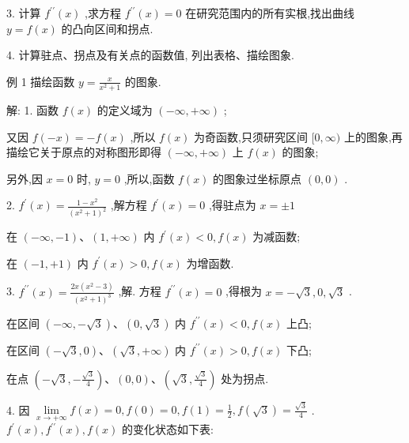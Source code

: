 \documentclass[lang=cn,newtx,12pt,scheme=chinese]{elegantbook}
\begin{document}
3. 计算 \({f}^{\prime \prime }\left( x\right)\) ,求方程 \({f}^{\prime \prime }\left( x\right) = 0\) 在研究范围内的所有实根,找出曲线 \(y = f\left( x\right)\) 的凸向区间和拐点.

4. 计算驻点、拐点及有关点的函数值, 列出表格、描绘图象.

例 1 描绘函数 \(y = \frac{x}{{x}^{2} + 1}\) 的图象.

解: 1. 函数 \(f\left( x\right)\) 的定义域为 \(\left( {-\infty , + \infty }\right)\) ;

又因 \(f\left( {-x}\right) = - f\left( x\right)\) ,所以 \(f\left( x\right)\) 为奇函数,只须研究区间 \(\lbrack 0,\infty )\) 上的图象,再描绘它关于原点的对称图形即得 \(\left( {-\infty , + \infty }\right)\) 上 \(f\left( x\right)\) 的图象;

另外,因 \(x = 0\) 时, \(y = 0\) ,所以,函数 \(f\left( x\right)\) 的图象过坐标原点 \(\left( {0,0}\right)\) .

2. \({f}^{\prime }\left( x\right) = \frac{1 - {x}^{2}}{{\left( {x}^{2} + 1\right) }^{2}}\) ,解方程 \({f}^{\prime }\left( x\right) = 0\) ,得驻点为 \(x = \pm 1\)

在 \(\left( {-\infty , - 1}\right) \text{、}\left( {1, + \infty }\right)\) 内 \({f}^{\prime }\left( x\right) < 0,f\left( x\right)\) 为减函数;

在 \(\left( {-1, + 1}\right)\) 内 \({f}^{\prime }\left( x\right) > 0,f\left( x\right)\) 为增函数.

3. \({f}^{\prime \prime }\left( x\right) = \frac{{2x}\left( {{x}^{2} - 3}\right) }{{\left( {x}^{2} + 1\right) }^{3}}\) ,解. 方程 \({f}^{\prime \prime }\left( x\right) = 0\) ,得根为 \(x = - \sqrt{3},0,\sqrt{3}\) .

在区间 \(\left( {-\infty , - \sqrt{3}}\right) \text{、}\left( {0,\sqrt{3}}\right)\) 内 \({f}^{\prime \prime }\left( x\right) < 0,f\left( x\right)\) 上凸;

在区间 \(\left( {-\sqrt{3},0}\right) \text{、}\left( {\sqrt{3}, + \infty }\right)\) 内 \({f}^{\prime \prime }\left( x\right) > 0,f\left( x\right)\) 下凸;

在点 \(\left( {-\sqrt{3}, - \frac{\sqrt{3}}{4}}\right) \text{、}\left( {0,0}\right) \text{、}\left( {\sqrt{3},\frac{\sqrt{3}}{4}}\right)\) 处为拐点.

4. 因 \(\mathop{\lim }\limits_{{x \rightarrow + \infty }}f\left( x\right) = 0,f\left( 0\right) = 0,f\left( 1\right) = \frac{1}{2},f\left( \sqrt{3}\right) = \frac{\sqrt{3}}{4}\) . \({f}^{\prime }\left( x\right) ,{f}^{\prime \prime }\left( x\right) ,f\left( x\right)\) 的变化状态如下表:
\end{document}

